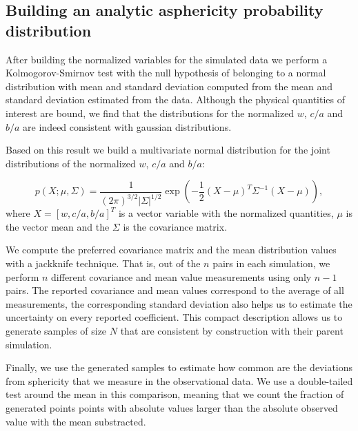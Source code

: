 \documentclass[a4paper,fleqn,usenatbib]{mnras}
\begin{document}
\subsection{Building an analytic asphericity probability distribution}

After building the normalized variables for the simulated data we perform a
Kolmogorov-Smirnov test with the null hypothesis of belonging to a
normal distribution with mean and standard deviation computed from the
mean and standard deviation estimated from the data. 
Although the physical quantities of interest are bound, we find that the
distributions for the normalized $w$, $c/a$ and $b/a$ are indeed
consistent with gaussian distributions. 

Based on this result we build a multivariate normal distribution for
the joint distributions of the normalized $w$, $c/a$ and $b/a$:

\begin{equation}
p(X; \mu, \Sigma) = \frac{1}{(2\pi)^{3/2}|\Sigma|^{1/2}}
\exp\left(-\frac{1}{2}(X-\mu)^{T}\Sigma^{-1}(X-\mu)\right), 
\label{eq:multivariate}
\end{equation}
% 
where $X=[w, c/a, b/a]^{T}$ is a vector variable with the normalized
quantities, $\mu$ is the vector mean and the $\Sigma$ is the
covariance matrix.  


We compute the preferred covariance matrix and the mean distribution values
with a jackknife technique. 
That is, out of the $n$ pairs in each simulation, we perform $n$
different covariance and mean value measurements using only $n-1$ pairs. 
The reported covariance and mean values correspond to the average of
all measurements, the corresponding standard deviation also helps us to
estimate the uncertainty on every reported coefficient.
This compact description allows us to generate samples of size $N$
that are consistent by construction with their parent simulation. 

Finally, we use the generated samples to estimate how
common are the deviations from sphericity that we measure in the
observational data.  
We use a double-tailed test around the mean in this comparison,
meaning that we count the fraction of generated points points with
absolute values larger than the absolute observed value with the mean
substracted.  


\end{document}

